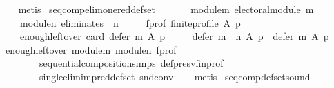 \begin{isabellebody}
\ \ \isamarkupfalse%
\ metis%
\endisatagproof
{\isafoldproof}%
%
\isadelimproof
\isanewline
%
\endisadelimproof
\isanewline
{}\isamarkupfalse%
\ seq{\isacharunderscore}{\kern0pt}comp{\isacharunderscore}{\kern0pt}elim{\isacharunderscore}{\kern0pt}one{\isacharunderscore}{\kern0pt}red{\isacharunderscore}{\kern0pt}def{\isacharunderscore}{\kern0pt}set{\isacharcolon}{\kern0pt}\isanewline
\ \ \isanewline
\ \ \ \ module{\isacharunderscore}{\kern0pt}m{\isacharcolon}{\kern0pt}\ {\isachardoublequoteopen}electoral{\isacharunderscore}{\kern0pt}module\ m{\isachardoublequoteclose}\ \isanewline
\ \ \ \ module{\isacharunderscore}{\kern0pt}n{\isacharcolon}{\kern0pt}\ {\isachardoublequoteopen}eliminates\ {}\ n{\isachardoublequoteclose}\ \isanewline
\ \ \ \ f{\isacharunderscore}{\kern0pt}prof{\isacharcolon}{\kern0pt}\ {\isachardoublequoteopen}finite{\isacharunderscore}{\kern0pt}profile\ A\ p{\isachardoublequoteclose}\ \isanewline
\ \ \ \ enough{\isacharunderscore}{\kern0pt}leftover{\isacharcolon}{\kern0pt}\ {\isachardoublequoteopen}card\ {\isacharparenleft}{\kern0pt}defer\ m\ A\ p{\isacharparenright}{\kern0pt}\ {\isachargreater}{\kern0pt}\ {}{\isachardoublequoteclose}\isanewline
\ \ \ {\isachardoublequoteopen}defer\ {\isacharparenleft}{\kern0pt}m\ {\isasymtriangleright}\ n{\isacharparenright}{\kern0pt}\ A\ p\ {\isasymsubset}\ defer\ m\ A\ p{\isachardoublequoteclose}\isanewline
%
\isadelimproof
\ \ %
\endisadelimproof
%
\isatagproof
{}\isamarkupfalse%
\ enough{\isacharunderscore}{\kern0pt}leftover\ module{\isacharunderscore}{\kern0pt}m\ module{\isacharunderscore}{\kern0pt}n\ f{\isacharunderscore}{\kern0pt}prof\isanewline
\ \ \ \ \ \ \ \ sequential{\isacharunderscore}{\kern0pt}composition{\isachardot}{\kern0pt}simps\ def{\isacharunderscore}{\kern0pt}presv{\isacharunderscore}{\kern0pt}fin{\isacharunderscore}{\kern0pt}prof\isanewline
\ \ \ \ \ \ \ \ single{\isacharunderscore}{\kern0pt}elim{\isacharunderscore}{\kern0pt}imp{\isacharunderscore}{\kern0pt}red{\isacharunderscore}{\kern0pt}def{\isacharunderscore}{\kern0pt}set\ snd{\isacharunderscore}{\kern0pt}conv\isanewline
\ \ \isamarkupfalse%
\ metis%
\endisatagproof
{\isafoldproof}%
%
\isadelimproof
\isanewline
%
\endisadelimproof
\isanewline
{}\isamarkupfalse%
\ seq{\isacharunderscore}{\kern0pt}comp{\isacharunderscore}{\kern0pt}def{\isacharunderscore}{\kern0pt}set{\isacharunderscore}{\kern0pt}sound{\isacharcolon}{\kern0pt}\isanewline
\ \ \isanewline

\end{isabellebody}
